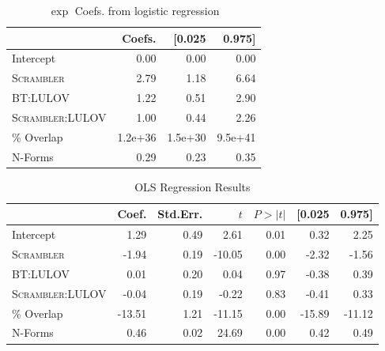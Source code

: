 \documentclass[11pt]{article}
\begin{document}
\begin{table}
  \centering
  \begin{tabular}{lrrr}
    \toprule[1.5pt]
    {} &  Coefs. &  [0.025 &  0.975] \\
    \midrule
    Intercept                          &    0.00 &    0.00 &    0.00 \\
    \textsc{Scrambler}                 &    2.79 &    1.18 &    6.64 \\
    BT:LULOV       &    1.22 &    0.51 &    2.90 \\
    \textsc{Scrambler}:LULOV &    1.00 &    0.44 &    2.26 \\
    \% Overlap                    & 1.2e+36 & 1.5e+30 & 9.5e+41 \\
    N-Forms                             &    0.29 &    0.23 &    0.35 \\
    \bottomrule[1.2pt]
  \end{tabular}
  \caption{\(\exp\) Coefs. from logistic regression}\label{tab:LE}
\end{table}

\begin{table}
  \centering
  \begin{tabular}{lrrrrrr}
    \toprule[1.5pt]
    {} &  Coef. &  Std.Err. &      $t$ &  $P>|t|$ &  [0.025 &  0.975] \\
    \midrule
    Intercept                          &   1.29 &      0.49 &   2.61 &   0.01 &    0.32 &    2.25 \\
    \textsc{Scrambler}                 &  -1.94 &      0.19 & -10.05 &   0.00 &   -2.32 &   -1.56 \\
    BT:LULOV       &   0.01 &      0.20 &   0.04 &   0.97 &   -0.38 &    0.39 \\
    \textsc{Scrambler}:LULOV &  -0.04 &      0.19 &  -0.22 &   0.83 &   -0.41 &    0.33 \\
    \% Overlap                    & -13.51 &      1.21 & -11.15 &   0.00 &  -15.89 &  -11.12 \\
    N-Forms                             &   0.46 &      0.02 &  24.69 &   0.00 &    0.42 &    0.49 \\
    \bottomrule[1.2pt]

  \end{tabular}
  \caption{OLS Regression Results}\label{tab:OR}
\end{table}
\end{document}

